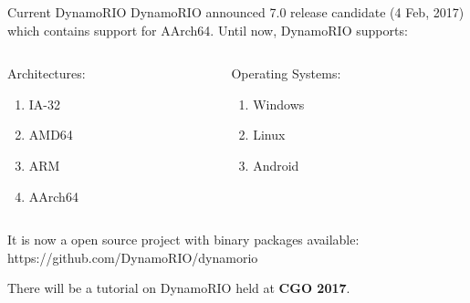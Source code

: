 \documentclass[aspectratio=169,xcolor=x11names]{beamer}
\begin{document}
	\appendix
	\begin{frame}[fragile]{Current DynamoRIO}
		DynamoRIO announced 7.0 release candidate (4 Feb, 2017) which contains \alert{support for AArch64}. Until now, DynamoRIO supports:
		
		\begin{columns}
			\begin{column}[T]{0.4\linewidth}
				\begin{block}{Architectures:}
					\begin{enumerate}
						\item IA-32
						\item AMD64
						\item ARM
						\item AArch64
					\end{enumerate}
				\end{block}
			\end{column}
			\begin{column}[T]{0.4\linewidth}
				\begin{block}{Operating Systems:}
					\begin{enumerate}
						\item Windows
						\item Linux
						\item Android
					\end{enumerate}
				\end{block}
			\end{column}
		\end{columns}
	
		It is now a open source project with binary packages available: {\color{blue}https://github.com/DynamoRIO/dynamorio}
		
		There will be a tutorial on DynamoRIO held at \textbf{CGO 2017}.
	\end{frame}
\end{document}
